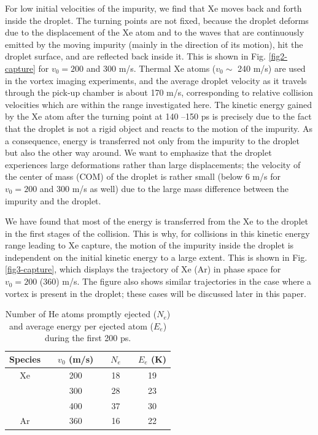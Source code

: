 For low initial velocities of the impurity, we find that
Xe moves back and forth inside the droplet.
The turning points are not fixed,
because the droplet deforms due to the displacement 
of the Xe atom and to the waves that are continuously emitted 
by the moving impurity
(mainly in the direction of its  motion),
hit the droplet surface, and are reflected back inside it.\citep{Cop16}
This is shown in 
Fig. \ref{fig2-capture} for $v_0= 200$  and 300 m/s. 
Thermal Xe atoms ($v_0 \sim$ 240 m/s) 
are used in the vortex imaging 
experiments,\citep{Gom14,Jon16} and the average droplet velocity 
as it travels through the pick-up chamber is about 
170 m/s,\citep{Gom11} corresponding to relative collision
velocities which are within the range investigated here.
The kinetic energy gained by the Xe atom 
after the turning point at 140 --150 ps
is precisely due to the fact that the droplet is not a rigid 
object and reacts to the motion of the impurity.
As a consequence, energy is transferred not only from the impurity to 
the droplet but also the other way around. 
We want to emphasize that the droplet experiences 
large deformations rather than 
large displacements;
the velocity of the center of mass (COM) of the droplet is 
rather small (below 6 m/s  for $v_0= 200$ and 300 m/s as well) 
due to the large 
mass difference between the impurity and the droplet.

We have found that most of the energy is transferred from 
the Xe to the droplet in the first stages of the collision.
This is why, for collisions in this kinetic energy range 
leading to Xe capture, the motion of the impurity inside the droplet
is independent on the initial kinetic energy to a large extent.  
This is shown in Fig. \ref{fig3-capture}, which displays the trajectory
of Xe (Ar) in phase space for $v_0= 200$ (360) m/s. 
The figure also shows similar trajectories in the case where a vortex 
is present in the droplet; these cases will be discussed later in this paper.

%
%
\begin{table}[!]
\small
\caption{\label{tab1} Number of He atoms promptly ejected ($N_e$)  and average energy per ejected atom
($E_e$) during the first 200 ps. }
\vspace{0.1 cm}
\begin{tabular}{c c cc c c  c}
\hline 
Species &\hspace{0.5 cm} & $v_0$ (m/s) &\hspace{0.5 cm}  & $N_e$ & \hspace{0.5 cm} & $E_e$  (K) \\
\hline
Xe  & &200 &  &18  & &19    \\
   && 300&  &28  &  &23   \\
   & &400 & &37 & &30 \\
   \hline
   Ar& & 360& & 16 & & 22 \\
\hline 
\end{tabular}
 
\end{table}

